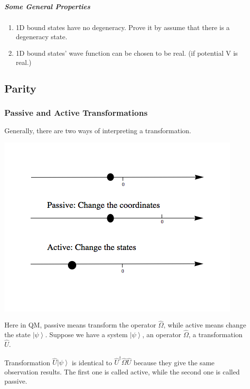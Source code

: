 \documentclass[letterpaper,10pt,english]{sphinxmanual}
\newcommand{\ket}[1]{\left| #1\right\rangle}
\begin{document}
\subparagraph{Some General Properties}
\label{Quantum/QuantumMechanics:some-general-properties}\begin{enumerate}
\item {} 
1D bound states have no degeneracy.
Prove it by assume that there is a degeneracy state.

\item {} 
1D bound states' wave function can be chosen to be real. (if potential V is real.)

\end{enumerate}


\subsection{Parity}
\label{Quantum/QuantumMechanics:parity}

\subsubsection{Passive and Active Transformations}
\label{Quantum/QuantumMechanics:passive-and-active-transformations}
Generally, there are two ways of interpreting a transformation.

\includegraphics{transformations.png}

Here in QM, passive means transform the operator \(\hat \Omega\), while active means change the state \(\ket{\psi}\). Suppose we have a system \(\ket{\psi}\), an operator \(\hat \Omega\), a transformation \(\hat U\).

Transformation \(\hat U \ket{\psi}\) is identical to \(\hat U^\dagger \hat \Omega \hat U\) because they give the same observation results. The first one is called active, while the second one is called passive.
\end{document}
